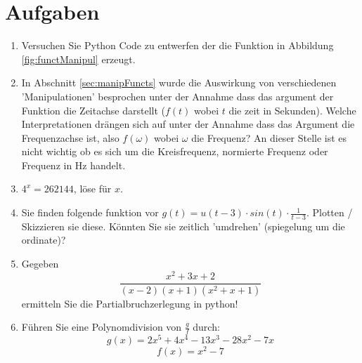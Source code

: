 \section{Aufgaben}
\begin{enumerate}
\item Versuchen Sie Python Code zu entwerfen der die Funktion in Abbildung \ref{fig:functManipul} erzeugt.
\item In Abschnitt \ref{sec:manipFuncts} wurde die Auswirkung von verschiedenen 'Manipulationen' besprochen unter der Annahme dass das argument der Funktion die Zeitachse darstellt ($f(t)$ wobei $t$ die zeit in Sekunden). Welche Interpretationen drängen sich auf unter der Annahme dass das Argument die Frequenzachse ist, also $f(\omega)$ wobei $\omega$ die Frequenz? An dieser Stelle ist es nicht wichtig ob es sich um die Kreisfrequenz, normierte Frequenz oder Frequenz in Hz handelt.

\item $4^x = 262144$, löse für $x$.

\item Sie finden folgende funktion vor $g(t) = u(t-3) \cdot sin(t) \cdot \frac{1}{t-3}$. Plotten / Skizzieren sie diese. Könnten Sie sie zeitlich 'umdrehen' (spiegelung um die ordinate)?

\item Gegeben $$ \frac{x^{2} + 3 x + 2}{\left(x - 2\right) \left(x + 1\right) \left(x^{2} + x + 1\right)}$$ ermitteln Sie die Partialbruchzerlegung in python!

\item Führen Sie eine Polynomdivision von $\frac{g}{f}$ durch:
$$g(x) = 2 x^{5} + 4 x^{4} - 13 x^{3} - 28 x^{2} - 7 x $$
$$f(x) = x^2-7 $$

\end{enumerate}

